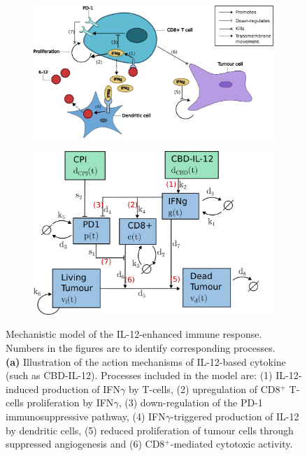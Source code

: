 \documentclass[11pt]{article}
\begin{document}
\begin{figure}[!ht]
    \centering
    \begin{subfigure}{.49\textwidth}
        \centering\includegraphics[scale=0.3]{finalBM.png}
        \caption{}        
    \end{subfigure}
    \begin{subfigure}{.49\textwidth}
        \centering\includegraphics[scale=0.3]{finalCP.png}    
        \caption{}
    \end{subfigure}
    \caption{Mechanistic model of the IL-12-enhanced immune response. Numbers in the figures are to identify corresponding processes. \\
    \textbf{(a)} Illustration of the action mechanisms of IL-12-based cytokine (such as CBD-IL-12). Processes included in the model are: (1) IL-12-induced production of IFN$\gamma$ by T-cells, (2) upregulation of CD8$^+$ T-cells proliferation by IFN$\gamma$, (3) down-regulation of the PD-1 immunosuppressive pathway, (4) IFN$\gamma$-triggered production of IL-12 by dendritic cells, (5) reduced proliferation of tumour cells through suppressed angiogenesis and (6) CD8$^+$-mediated cytotoxic activity.\\
}
\end{figure}
\end{document}
